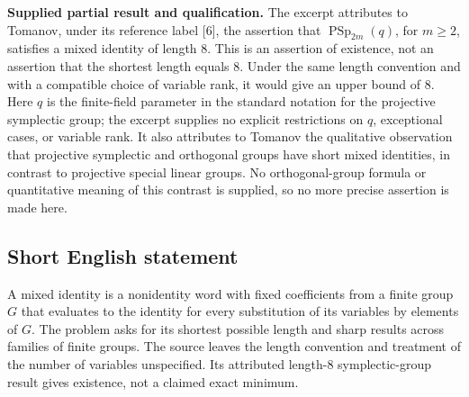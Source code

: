 \documentclass[11pt]{article}
\begin{document}
\textbf{Supplied partial result and qualification.} The excerpt attributes to Tomanov, under its reference label [6], the assertion that \(\operatorname{PSp}_{2m}(q)\), for \(m\geq 2\), satisfies a mixed identity of length \(8\). This is an assertion of existence, not an assertion that the shortest length equals \(8\). Under the same length convention and with a compatible choice of variable rank, it would give an upper bound of \(8\). Here \(q\) is the finite-field parameter in the standard notation for the projective symplectic group; the excerpt supplies no explicit restrictions on \(q\), exceptional cases, or variable rank. It also attributes to Tomanov the qualitative observation that projective symplectic and orthogonal groups have short mixed identities, in contrast to projective special linear groups. No orthogonal-group formula or quantitative meaning of this contrast is supplied, so no more precise assertion is made here.
\subsection{Short English statement}
A mixed identity is a nonidentity word with fixed coefficients from a finite group \(G\) that evaluates to the identity for every substitution of its variables by elements of \(G\). The problem asks for its shortest possible length and sharp results across families of finite groups. The source leaves the length convention and treatment of the number of variables unspecified. Its attributed length-\(8\) symplectic-group result gives existence, not a claimed exact minimum.
\end{document}
